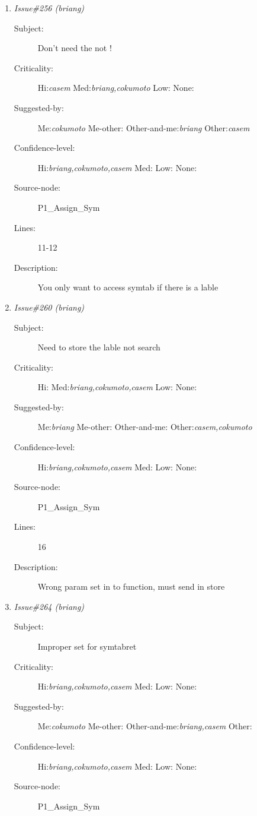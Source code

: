\begin{enumerate}
\begin{description}
\item [Lines:] 28

\item [Description:] The operation should have a + not an *
\end{description}
\item {\it Issue\#256 (briang)}
\begin{description}
\item [Subject:] Don't need the not !
\item [Criticality:] Hi:{\it casem} Med:{\it briang,cokumoto} Low:{\it } None:{\it }
\item [Suggested-by:] Me:{\it cokumoto} Me-other:{\it } Other-and-me:{\it briang} Other:{\it casem}
\item [Confidence-level:] Hi:{\it briang,cokumoto,casem} Med:{\it } Low:{\it } None:{\it }
\item [Source-node:] P1\_Assign\_Sym

\item [Lines:] 11-12

\item [Description:] You only want to access symtab if there is a lable
\end{description}
\item {\it Issue\#260 (briang)}
\begin{description}
\item [Subject:] Need to store the lable not search
\item [Criticality:] Hi:{\it } Med:{\it briang,cokumoto,casem} Low:{\it } None:{\it }
\item [Suggested-by:] Me:{\it briang} Me-other:{\it } Other-and-me:{\it } Other:{\it casem,cokumoto}
\item [Confidence-level:] Hi:{\it briang,cokumoto,casem} Med:{\it } Low:{\it } None:{\it }
\item [Source-node:] P1\_Assign\_Sym

\item [Lines:] 16

\item [Description:] Wrong param set in to function, must send in 
store
\end{description}
\item {\it Issue\#264 (briang)}
\begin{description}
\item [Subject:] Improper set for symtabret
\item [Criticality:] Hi:{\it briang,cokumoto,casem} Med:{\it } Low:{\it } None:{\it }
\item [Suggested-by:] Me:{\it cokumoto} Me-other:{\it } Other-and-me:{\it briang,casem} Other:{\it }
\item [Confidence-level:] Hi:{\it briang,cokumoto,casem} Med:{\it } Low:{\it } None:{\it }
\item [Source-node:] P1\_Assign\_Sym


\end{description}
\end{enumerate}
